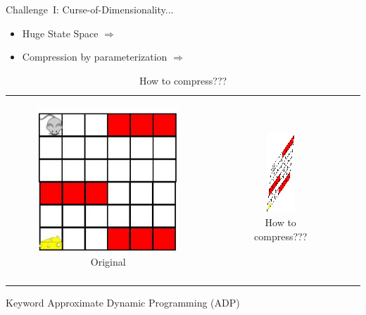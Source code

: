 \documentclass[10pt,handout]{beamer}
\begin{document}
\begin{frame}[fragile]{Challenge~I: {Curse-of-Dimensionality}...}

\begin{itemize}
\item Huge State Space $\Rightarrow$  {\color{orange}{Exact Decision $u^*$ not possible}}
\item Compression by parameterization $\Rightarrow$ {}
\end{itemize}

\begin{table}
\begin{tabular}{ccc}
\begin{minipage}{0.3\textwidth}
\begin{figure}
\includegraphics[scale=0.4]{mouse-single.png}
\caption*{Original}
\end{figure}
\end{minipage}
&
\begin{minipage}{0.3\textwidth}
\begin{figure}
\includegraphics[scale=0.4]{compress-mouse.png}
\caption*{How to compress???}
\end{figure}
\end{minipage}
&
\begin{minipage}{0.3\textwidth}
\begin{block}{Loss}
{\color{orange}{How bad is $\tu$ in comparison to $u^*$?}}\\
\end{block}
\end{minipage}
\end{tabular}
\end{table}

\begin{block}{Keyword}
Approximate Dynamic Programming (ADP)
\end{block}
\end{frame}
\end{document}
